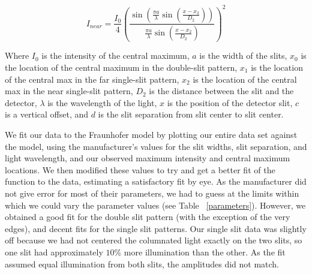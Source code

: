 \documentclass[prb,preprint]{revtex4-1}
\begin{document}
\begin{equation}
I_{near}= \frac{I_{0}}{4}(\frac{\sin(\frac{\pi a}{\lambda}\sin(\frac{x-x_{2}}{D_{2}}))}{\frac{\pi a}{\lambda}\sin(\frac{x-x_{2}}{D_{2}})})^{2} 
\end{equation}

Where $I_0$ is the intensity of the central maximum, $a$ is the width of the slits, $x_0$ is the location of the central maximum in the double-slit pattern, $x_1$ is the location of the central max in the far single-slit pattern, $x_2$ is the location of the central max in the near single-slit pattern, $D_2$ is the distance between the slit and the detector, $\lambda$ is the wavelength of the light, $x$ is the position of the detector slit, $c$ is a vertical offset, and $d$ is the slit separation from slit center to slit center. 

We fit our data to the Fraunhofer model by plotting our entire data set against the model, using the manufacturer's values for the slit widths, slit separation, and light wavelength, and our observed maximum intensity and central maximum locations.  We then modified these values to try and get a better fit of the function to the data, estimating a satisfactory fit by eye.  As the manufacturer did not give error for most of their parameters, we had to guess at the limits within which we could vary the parameter values (see Table ~\ref{parameters}). However, we obtained a good fit for the double slit pattern (with the exception of the very edges), and decent fits for the single slit patterns.  Our single slit data was slightly off because we had not centered the columnated light exactly on the two slits, so one slit had approximately $10\%$ more illumination than the other.  As the fit assumed equal illumination from both slits, the amplitudes did not match.  
\end{document}
